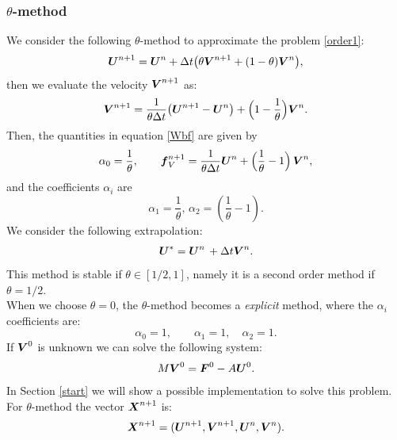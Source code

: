 \documentclass[english,a4paper]{article}
\newcommand{\Xbf}{\text{\mbox{\boldmath $X$}}}
\newcommand{\Ubf}{\text{\mbox{\boldmath $U$}}}
\newcommand{\fbf}{\text{\mbox{\boldmath $f$}}}
\newcommand{\Fbf}{\text{\mbox{\boldmath $F$}}}
\newcommand{\Wbf}{\text{\mbox{\boldmath $V$}}}
\begin{document}
\subsubsection{$\theta$-method}\label{TM}
We consider the following  $\theta$-method to approximate the problem \eqref{order1}: 
\begin{equation} \label{vel}
\Ubf^{n+1}=\Ubf^n+ \Delta t\big(\theta \Wbf^{n+1}+ (1-\theta)\Wbf^n\big),
\end{equation}
then we evaluate the velocity $\Wbf^{n+1}$ as:
\begin{equation}\label{theta}
\Wbf^{n+1}=\frac{1}{\theta\Delta t}\big(\Ubf^{n+1}-\Ubf^n\big)+\Big(1-\frac{1}{\theta}\Big)\Wbf^n.
\end{equation}
Then,  the quantities in equation
\eqref{Wbf} are given by  
$$\displaystyle\alpha_0=\frac{1}{\theta}, \qquad
\displaystyle \fbf_V^{n+1}=\frac{1}{\theta\Delta t}\Ubf^n+\Big(\frac{1}{\theta}-1\Big)\,\Wbf^n,$$
and the coefficients $\alpha_i$ are
\begin{equation}\label{alphatheta}
\displaystyle\alpha_{1}=\frac{1}{\theta}, \, 
\displaystyle\alpha_2=\left(\frac{1}{\theta}-1\right).
\end{equation}
We consider the following extrapolation:
\[
\Ubf^*=\Ubf^{n}\,+ \Delta t \Wbf^n.
\]
This method is stable if  $\theta\in[1/2,1]$, namely  it is a second
order method  if  $\theta=1/2$. \\
When we choose $\theta = 0$, the $\theta$-method becomes a {\sl
  explicit} method, where the $\alpha_i$ coefficients are:
$$
\alpha_0=1, \qquad \alpha_1=1, \quad \alpha_2=1.  
$$
If $\Wbf^0$ is unknown we can solve the following system:
$$M\Wbf^0= \Fbf^0-A\Ubf^0.$$
In  Section \ref{start} we will show a possible implementation to solve
this problem.
For  $\theta$-method the vector $\Xbf^{n+1}$ is:
$$\Xbf^{n+1}=(\Ubf^{n+1},\Wbf^{n+1}, \Ubf^n, \Wbf^n). $$
\end{document}
